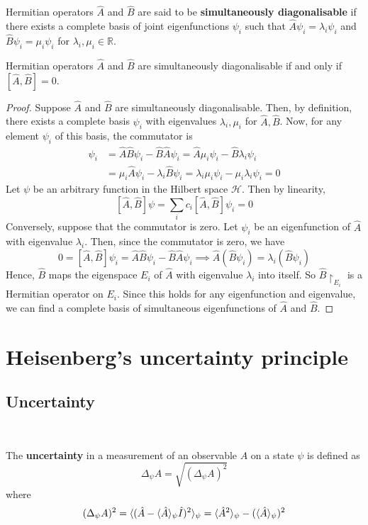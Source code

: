 \documentclass[a4paper]{article}
\begin{document}
\begin{definition}
	Hermitian operators \( \hat A \) and \( \hat B \) are said to be \textbf{simultaneously diagonalisable} if there exists a complete basis of joint eigenfunctions \( {\psi_i} \) such that \( \hat A \psi_i = \lambda_i \psi_i \) and \( \hat B \psi_i = \mu_i \psi_i \) for \( \lambda_i, \mu_i \in \mathbb R \).
\end{definition}

\begin{theorem}
	Hermitian operators \( \hat A \) and \( \hat B \) are simultaneously diagonalisable if and only if \( [\hat A, \hat B] = 0 \).
\end{theorem}
\begin{proof}
	Suppose \( \hat A \) and \( \hat B \) are simultaneously diagonalisable.
	Then, by definition, there exists a complete basis \( {\psi_i} \) with eigenvalues \( \lambda_i, \mu_i \) for \( \hat A, \hat B \).
	Now, for any element \( \psi_i \) of this basis, the commutator is
	\begin{align*}
        [\hat A, \hat B] \psi_i &= \hat A \hat B \psi_i - \hat B \hat A \psi_i = \hat A \mu_i \psi_i - \hat B \lambda_i \psi_i \\ 
        &= \mu_i \hat A \psi_i - \lambda_i \hat B \psi_i = \lambda_i \mu_i \psi_i - \mu_i \lambda_i \psi_i = 0
    \end{align*}
	Let \( \psi \) be an arbitrary function in the Hilbert space \( \mathcal H \).
	Then by linearity,
	\[
		[\hat A, \hat B] \psi = \sum_i c_i [\hat A, \hat B]\psi_i = 0
	\]
	Conversely, suppose that the commutator is zero.
	Let \( \psi_i \) be an eigenfunction of \( \hat A \) with eigenvalue \( \lambda_i \).
	Then, since the commutator is zero, we have
	\[
		0 = [\hat A, \hat B] \psi_i = \hat A \hat B \psi_i - \hat B \hat A \psi_i \implies \hat A(\hat B \psi_i) = \lambda_i (\hat B \psi_i)
	\]
	Hence, \( \hat B \) maps the eigenspace \( E_i \) of \( \hat A \) with eigenvalue \( \lambda_i \) into itself.
	So \( \hat B\restriction_{E_i} \) is a Hermitian operator on \( E_i \).
	Since this holds for any eigenfunction and eigenvalue, we can find a complete basis of simultaneous eigenfunctions of \( \hat A \) and \( \hat B \).
\end{proof}

\section{Heisenberg's uncertainty principle}
\subsection{Uncertainty}\ \vspace{-1.5em}
\begin{definition}
	The \textbf{uncertainty} in a measurement of an observable \( A \) on a state \( \psi \) is defined as
	\[
		\Delta_\psi A = \sqrt{(\Delta_\psi A)^2}
	\]
    where 
    \[
		(\Delta_\psi A)^2 = \langle{(\hat A - \langle{\hat A}\rangle_\psi \hat I)^2}\rangle_\psi = \langle{\hat A^2}\rangle_\psi - (\langle{\hat A}\rangle_\psi)^2
	\]
\end{definition}
\end{document}
